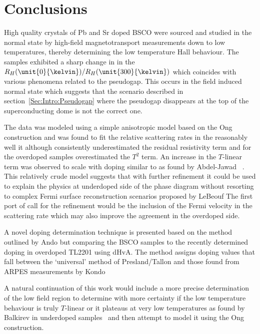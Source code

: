 
\section{Conclusions}

High quality crystals of Pb and Sr doped \ac{BSCO} were sourced and studied in the normal state by high-field magnetotransport measurements down to low temperatures, thereby determining the low temperature Hall behaviour. The samples exhibited a sharp change in in the $R_H(\unit{0}{\kelvin})/R_H(\unit{300}{\kelvin})$ which coincides with various phenomena related to the pseudogap. This occurs in the field induced normal state which suggests that the scenario described in section~\ref{Sec:Intro:Pseudogap} where the pseudogap disappears at the top of the superconducting dome is not the correct one.

The data was modeled using a simple anisotropic model based on the Ong construction and was found to fit the relative scattering rates in the reasonably well it although consistently underestimated the residual resistivity term and for the overdoped samples overestimated the $T^2$ term. An increase in the $T$-linear term was observed to scale with doping similar to as found by Abdel-Jawad \etal~\cite{Abdel-Jawad2007}. This relatively crude model suggests that with further refinement it could be used to explain the physics at underdoped side of the phase diagram without resorting to complex Fermi surface reconstruction scenarios proposed by LeBeouf \etal The first port of call for the refinement would be the inclusion of the Fermi velocity in the scattering rate which may also improve the agreement in the overdoped side.

A novel doping determination technique is presented based on the method outlined by Ando \etal{} but comparing the \ac{BSCO} samples to the recently determined doping in overdoped \ac{TL2201} using \ac{dHvA}. The method assigns doping values that fall between the `universal' method of Presland/Tallon and those found from \ac{ARPES} measurements by Kondo \etal

A natural continuation of this work would include a more precise determination of the low field region to determine with more certainty if the low temperature behaviour is truly $T$-linear or it plateaus at very low temperatures as found by Balkirev \etal{} in underdoped samples~\cite{Balakirev2003} and then attempt to model it using the Ong construction.
